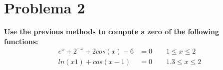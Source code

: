 \section*{Problema 2}
\textbf{Use the previous methods to compute a zero of the following functions:}
\begin{align*}
    e^x+2^{-x} + 2cos(x) - 6 & =0  \qquad 1\leq   x \leq 2 \\
    ln(x1)+cos(x-1)          & =0  \qquad 1.3\leq x \leq 2
\end{align*}